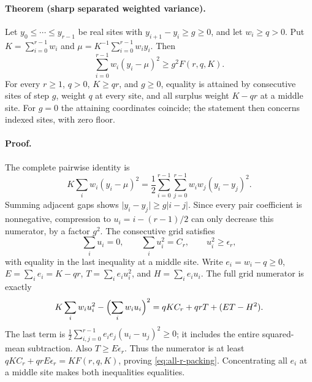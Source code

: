\paragraph{Theorem (sharp separated weighted variance).}
Let \(y_0\le\cdots\le y_{r-1}\) be real sites with
\(y_{i+1}-y_i\ge g\ge0\), and let \(w_i\ge q>0\). Put
\(K=\sum_{i=0}^{r-1}w_i\) and
\(\mu=K^{-1}\sum_{i=0}^{r-1}w_i y_i\). Then
\begin{equation}
 \sum_{i=0}^{r-1}w_i(y_i-\mu)^2\ge g^2 F(r,q,K).
 \tag{RP2}\label{eq:all-r-packing}
\end{equation}
For every \(r\ge1\), \(q>0\), \(K\ge qr\), and \(g\ge0\), equality
is attained by consecutive sites of step \(g\), weight \(q\) at every
site, and all surplus weight \(K-qr\) at a middle site.
For \(g=0\) the attaining coordinates coincide; the statement then
concerns indexed sites, with zero floor.

\paragraph{Proof.}
The complete pairwise identity is
\[
 K\sum_iw_i(y_i-\mu)^2
 =\frac12\sum_{i=0}^{r-1}\sum_{j=0}^{r-1}w_iw_j(y_i-y_j)^2.
\]
Summing adjacent gaps shows
\(\lvert y_i-y_j\rvert\ge g\lvert i-j\rvert\).
Since every pair coefficient is nonnegative, compression to
\(u_i=i-(r-1)/2\) can only decrease this numerator, by a factor \(g^2\).
The consecutive grid satisfies
\[
 \sum_i u_i=0,\qquad \sum_i u_i^2=C_r,\qquad
 u_i^2\ge\epsilon_r,
\]
with equality in the last inequality at a middle site.
Write \(e_i=w_i-q\ge0\), \(E=\sum_i e_i=K-qr\),
\(T=\sum_i e_i u_i^2\), and \(H=\sum_i e_i u_i\).
The full grid numerator is exactly
\[
 K\sum_iw_i u_i^2-\Bigl(\sum_iw_i u_i\Bigr)^2
   =qKC_r+qrT+(ET-H^2).
\]
The last term is
\(\frac12\sum_{i,j=0}^{r-1}e_i e_j(u_i-u_j)^2\ge0\);
it includes the entire squared-mean subtraction. Also
\(T\ge E\epsilon_r\). Thus the numerator is at least
\(qKC_r+qrE\epsilon_r=KF(r,q,K)\), proving
\eqref{eq:all-r-packing}. Concentrating all \(e_i\) at a middle
site makes both inequalities equalities.

